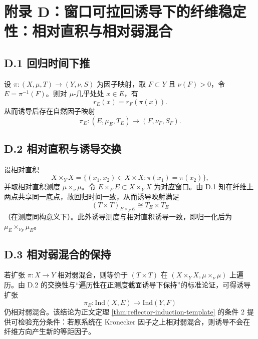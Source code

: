 \section{附录 D：窗口可拉回诱导下的纤维稳定性：相对直积与相对弱混合}
\label{app:relative-product}

\subsection*{D.1 回归时间下推}

设 $\pi:(X,\mu,T)\to(Y,\nu,S)$ 为因子映射，取 $F\subset Y$ 且 $\nu(F)>0$，令 $E=\pi^{-1}(F)$。则对 $\mu$-几乎处处 $x\in E$，有
\[
r_E(x)=r_F(\pi(x)).
\]
从而诱导后存在自然因子映射
\[
\pi_E:(E,\mu_E,T_E)\to(F,\nu_F,S_F).
\]

\subsection*{D.2 相对直积与诱导交换}

设相对直积
\[
X\times_Y X=\{(x_1,x_2)\in X\times X:\pi(x_1)=\pi(x_2)\},
\]
并取相对直积测度 $\mu\times_\nu\mu$。令 $E\times_F E\subset X\times_Y X$ 为对应窗口。由 D.1 知在纤维上两点共享同一底点，故回归时间一致，从而诱导映射满足
\[
(T\times T)_{E\times_F E}\cong T_E\times T_E
\]
（在测度同构意义下）。此外诱导测度与相对直积诱导一致，即归一化后为 $\mu_E\times_{\nu_F}\mu_E$。

\subsection*{D.3 相对弱混合的保持}

若扩张 $\pi:X\to Y$ 相对弱混合，则等价于 $(T\times T)$ 在 $(X\times_Y X,\mu\times_\nu\mu)$ 上遍历。由 D.2 的交换性与“遍历性在正测度截面诱导下保持”的标准论证，可得诱导扩张
\[
\pi_E:\mathrm{Ind}(X,E)\to \mathrm{Ind}(Y,F)
\]
仍相对弱混合。该结论为正文定理 \ref{thm:reflector-induction-template} 的条件 2 提供可检验充分条件：若原系统在 Kronecker 因子之上相对弱混合，则诱导不会在纤维方向产生新的等距因子。


